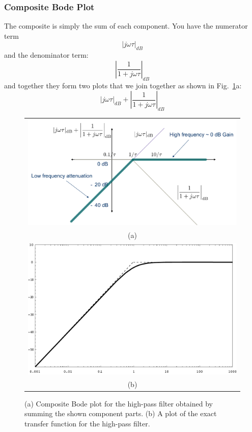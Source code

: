 \subsubsection{Composite Bode Plot}
The composite is simply the sum of each component.  You have the numerator term
    \begin{equation}
        {\left| {j\omega \tau } \right|_{dB}}
    \end{equation}
and the denominator term:
    \begin{equation}
        {\left| {\frac{1}{{1 + j\omega \tau }}} \right|_{dB}}
    \end{equation}
and together they form two plots that we join together as shown in Fig.~\ref{fig:bode}a:
    \begin{equation}
        {\left| {j\omega \tau } \right|_{dB}} + {\left| {\frac{1}{{1 + j\omega \tau }}} \right|_{dB}}
    \end{equation}
\begin{figure}[tb]
\begin{center}
\begin{tabular}{c}
\includegraphics[width=.75\columnwidth]{mod1_3_11_bode3} \\
(a) \\
\includegraphics[angle=-0.0,width=.75\columnwidth]{mag_hpf} \\
(b) \\
\end{tabular}
\end{center}
\caption{(a) Composite Bode plot for the high-pass filter obtained by summing the shown component parts.  (b) A plot of the exact transfer function for the high-pass filter.}
\label{fig:bode}
\end{figure}
